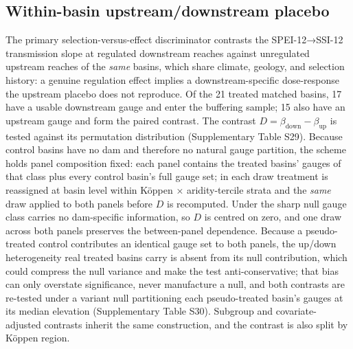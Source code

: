 \documentclass[
]{agujournal2019}
\begin{document}
\subsection{Within-basin upstream/downstream
placebo}\label{within-basin-upstreamdownstream-placebo}

The primary selection-versus-effect discriminator contrasts the
SPEI-12→SSI-12 transmission slope at regulated downstream reaches
against unregulated upstream reaches of the \emph{same} basins, which
share climate, geology, and selection history: a genuine regulation
effect implies a downstream-specific dose-response the upstream placebo
does not reproduce. Of the 21 treated matched basins, 17 have a usable
downstream gauge and enter the buffering sample; 15 also have an
upstream gauge and form the paired contrast. The contrast
\(D = \beta_{\text{down}} - \beta_{\text{up}}\) is tested against its
permutation distribution (Supplementary Table S29). Because control
basins have no dam and therefore no natural gauge partition, the scheme
holds panel composition fixed: each panel contains the treated basins'
gauges of that class plus every control basin's full gauge set; in each
draw treatment is reassigned at basin level within Köppen ×
aridity-tercile strata and the \emph{same} draw applied to both panels
before \(D\) is recomputed. Under the sharp null gauge class carries no
dam-specific information, so \(D\) is centred on zero, and one draw
across both panels preserves the between-panel dependence. Because a
pseudo-treated control contributes an identical gauge set to both
panels, the up/down heterogeneity real treated basins carry is absent
from its null contribution, which could compress the null variance and
make the test anti-conservative; that bias can only overstate
significance, never manufacture a null, and both contrasts are re-tested
under a variant null partitioning each pseudo-treated basin's gauges at
its median elevation (Supplementary Table S30). Subgroup and
covariate-adjusted contrasts inherit the same construction, and the
contrast is also split by Köppen region.
\end{document}
